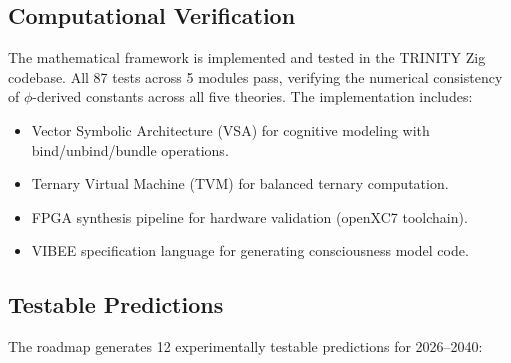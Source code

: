 \documentclass[12pt,a4paper]{article}
\begin{document}
\subsection{Computational Verification}

The mathematical framework is implemented and tested in the TRINITY Zig
codebase. All 87 tests across 5 modules pass, verifying the numerical
consistency of $\phi$-derived constants across all five theories. The
implementation includes:

\begin{itemize}[leftmargin=2em]
  \item Vector Symbolic Architecture (VSA) for cognitive modeling with
    bind/unbind/bundle operations.
  \item Ternary Virtual Machine (TVM) for balanced ternary computation.
  \item FPGA synthesis pipeline for hardware validation (openXC7 toolchain).
  \item VIBEE specification language for generating consciousness model code.
\end{itemize}

\subsection{Testable Predictions}

The roadmap generates 12 experimentally testable predictions for 2026--2040:
\end{document}
